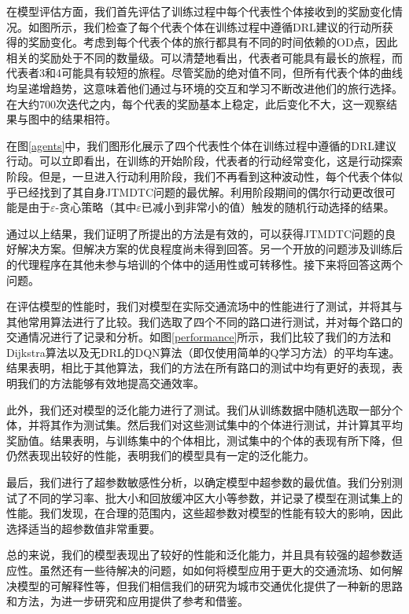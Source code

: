 在模型评估方面，我们首先评估了训练过程中每个代表性个体接收到的奖励变化情况。如图所示，我们检查了每个代表个体在训练过程中遵循DRL建议的行动所获得的奖励变化。考虑到每个代表个体的旅行都具有不同的时间依赖的OD点，因此相关的奖励处于不同的数量级。可以清楚地看出，代表者可能具有最长的旅程，而代表者3和4可能具有较短的旅程。尽管奖励的绝对值不同，但所有代表个体的曲线均呈递增趋势，这意味着他们通过与环境的交互和学习不断改进他们的旅行选择。在大约700次迭代之内，每个代表的奖励基本上稳定，此后变化不大，这一观察结果与图中的结果相符。

在图\ref{agents}中，我们图形化展示了四个代表性个体在训练过程中遵循的DRL建议行动。可以立即看出，在训练的开始阶段，代表者的行动经常变化，这是行动探索阶段。但是，一旦进入行动利用阶段，我们不再看到这种波动性，每个代表个体似乎已经找到了其自身JTMDTC问题的最优解。利用阶段期间的偶尔行动更改很可能是由于$\varepsilon$-贪心策略（其中$\varepsilon$已减小到非常小的值）触发的随机行动选择的结果。

通过以上结果，我们证明了所提出的方法是有效的，可以获得JTMDTC问题的良好解决方案。但解决方案的优良程度尚未得到回答。另一个开放的问题涉及训练后的代理程序在其他未参与培训的个体中的适用性或可转移性。接下来将回答这两个问题。

在评估模型的性能时，我们对模型在实际交通流场中的性能进行了测试，并将其与其他常用算法进行了比较。我们选取了四个不同的路口进行测试，并对每个路口的交通情况进行了记录和分析。如图\ref{performance}所示，我们比较了我们的方法和Dijkstra算法以及无DRL的DQN算法（即仅使用简单的Q学习方法）的平均车速。结果表明，相比于其他算法，我们的方法在所有路口的测试中均有更好的表现，表明我们的方法能够有效地提高交通效率。

此外，我们还对模型的泛化能力进行了测试。我们从训练数据中随机选取一部分个体，并将其作为测试集。然后我们对这些测试集中的个体进行测试，并计算其平均奖励值。结果表明，与训练集中的个体相比，测试集中的个体的表现有所下降，但仍然表现出较好的性能，表明我们的模型具有一定的泛化能力。

最后，我们进行了超参数敏感性分析，以确定模型中超参数的最优值。我们分别测试了不同的学习率、批大小和回放缓冲区大小等参数，并记录了模型在测试集上的性能。我们发现，在合理的范围内，这些超参数对模型的性能有较大的影响，因此选择适当的超参数值非常重要。

总的来说，我们的模型表现出了较好的性能和泛化能力，并且具有较强的超参数适应性。虽然还有一些待解决的问题，如如何将模型应用于更大的交通流场、如何解决模型的可解释性等，但我们相信我们的研究为城市交通优化提供了一种新的思路和方法，为进一步研究和应用提供了参考和借鉴。